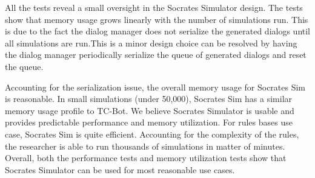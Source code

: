 All the tests reveal a small oversight in the Socrates Simulator design. The tests show that memory usage grows linearly with the number of simulations run. This is due to the fact the dialog manager does not serialize the generated dialogs until all simulations are run.This is a minor design choice can be resolved by having the dialog manager periodically serialize the queue of generated dialogs and reset the queue. 

Accounting for the serialization issue, the overall memory usage for Socrates Sim is reasonable. In small simulations (under 50,000), Socrates Sim has a similar memory usage profile to TC-Bot. We believe Socrates Simulator is usable and provides predictable performance and memory utilization. For rules bases use case, Socrates Sim is quite efficient. Accounting for the complexity of the rules, the researcher is able to run thousands of simulations in matter of minutes. Overall, both the performance tests and memory utilization tests show that Socrates Simulator can be used for most reasonable use cases. 

